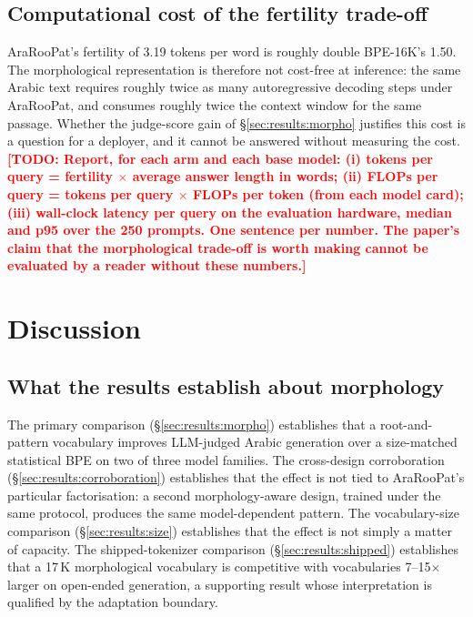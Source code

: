 \documentclass[a4paper,fleqn]{cas-sc}
\newcommand{\todo}[1]{\textcolor{red}{\textbf{[\textsc{TODO}: #1]}}}
\begin{document}
\subsection{Computational cost of the fertility trade-off}
\label{sec:results:cost}

AraRooPat's fertility of 3.19 tokens per word is roughly double BPE-16K's 1.50. The morphological representation is therefore not cost-free at inference: the same Arabic text requires roughly twice as many autoregressive decoding steps under AraRooPat, and consumes roughly twice the context window for the same passage. Whether the judge-score gain of \S\ref{sec:results:morpho} justifies this cost is a question for a deployer, and it cannot be answered without measuring the cost.
\todo{Report, for each arm and each base model: (i) tokens per query = fertility $\times$ average answer length in words; (ii) FLOPs per query = tokens per query $\times$ FLOPs per token (from each model card); (iii) wall-clock latency per query on the evaluation hardware, median and p95 over the 250 prompts. One sentence per number. The paper's claim that the morphological trade-off is worth making cannot be evaluated by a reader without these numbers.}

\section{Discussion}
\label{sec:discussion}

\subsection{What the results establish about morphology}
\label{sec:discussion:morpho}

The primary comparison (\S\ref{sec:results:morpho}) establishes that a root-and-pattern vocabulary improves LLM-judged Arabic generation over a size-matched statistical BPE on two of three model families. The cross-design corroboration (\S\ref{sec:results:corroboration}) establishes that the effect is not tied to AraRooPat's particular factorisation: a second morphology-aware design, trained under the same protocol, produces the same model-dependent pattern. The vocabulary-size comparison (\S\ref{sec:results:size}) establishes that the effect is not simply a matter of capacity. The shipped-tokenizer comparison (\S\ref{sec:results:shipped}) establishes that a 17\,K morphological vocabulary is competitive with vocabularies 7--15$\times$ larger on open-ended generation, a supporting result whose interpretation is qualified by the adaptation boundary.
\end{document}
